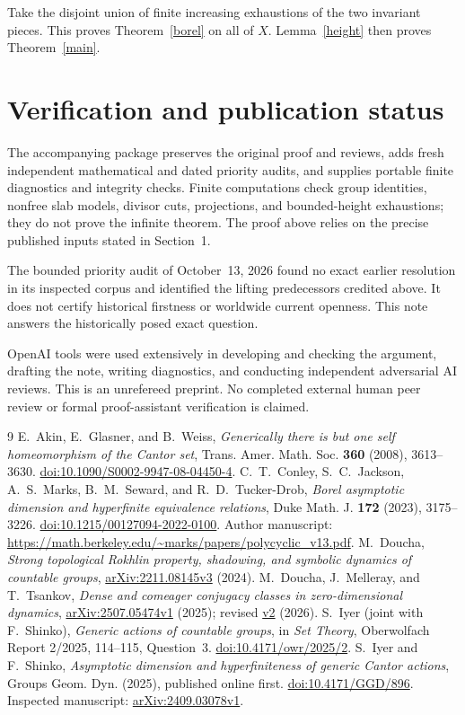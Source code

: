 \documentclass[11pt]{article}
\begin{document}
Take the disjoint union of finite increasing exhaustions of the two
invariant pieces. This proves Theorem~\ref{borel} on all of $X$.
Lemma~\ref{height} then proves Theorem~\ref{main}.

\section{Verification and publication status}
The accompanying package preserves the original proof and reviews, adds
fresh independent mathematical and dated priority audits, and supplies
portable finite diagnostics and integrity checks. Finite computations
check group identities, nonfree slab models, divisor cuts, projections,
and bounded-height exhaustions; they do not prove the infinite theorem.
The proof above relies on the precise published inputs stated in Section~1.

The bounded priority audit of October~13, 2026 found no exact earlier
resolution in its inspected corpus and identified the lifting predecessors
credited above. It does not certify historical firstness or worldwide
current openness. This note answers the historically posed exact question.

OpenAI tools were used extensively in developing and checking the argument,
drafting the note, writing diagnostics, and conducting independent adversarial
AI reviews. This is an unrefereed preprint. No completed external human peer
review or formal proof-assistant verification is claimed.

\begin{thebibliography}{9}
 E.~Akin, E.~Glasner, and B.~Weiss,
\emph{Generically there is but one self homeomorphism of the Cantor set},
Trans. Amer. Math. Soc. \textbf{360} (2008), 3613--3630.
\href{https://doi.org/10.1090/S0002-9947-08-04450-4}{doi:10.1090/S0002-9947-08-04450-4}.
 C.~T.~Conley, S.~C.~Jackson, A.~S.~Marks, B.~M.~Seward,
and R.~D.~Tucker-Drob,
\emph{Borel asymptotic dimension and hyperfinite equivalence relations},
Duke Math. J. \textbf{172} (2023), 3175--3226.
\href{https://doi.org/10.1215/00127094-2022-0100}{doi:10.1215/00127094-2022-0100}.
Author manuscript: \url{https://math.berkeley.edu/~marks/papers/polycyclic_v13.pdf}.
 M.~Doucha,
\emph{Strong topological Rokhlin property, shadowing, and symbolic dynamics
of countable groups}, \href{https://arxiv.org/abs/2211.08145v3}{arXiv:2211.08145v3} (2024).
 M.~Doucha, J.~Melleray, and T.~Tsankov,
\emph{Dense and comeager conjugacy classes in zero-dimensional dynamics},
\href{https://arxiv.org/abs/2507.05474v1}{arXiv:2507.05474v1} (2025);
revised \href{https://arxiv.org/abs/2507.05474v2}{v2} (2026).
 S.~Iyer (joint with F.~Shinko),
\emph{Generic actions of countable groups}, in \emph{Set Theory},
Oberwolfach Report 2/2025, 114--115, Question~3.
\href{https://doi.org/10.4171/owr/2025/2}{doi:10.4171/owr/2025/2}.
 S.~Iyer and F.~Shinko,
\emph{Asymptotic dimension and hyperfiniteness of generic Cantor actions},
Groups Geom. Dyn. (2025), published online first.
\href{https://doi.org/10.4171/GGD/896}{doi:10.4171/GGD/896}.
Inspected manuscript: \href{https://arxiv.org/abs/2409.03078v1}{arXiv:2409.03078v1}.
\end{thebibliography}
\end{document}
